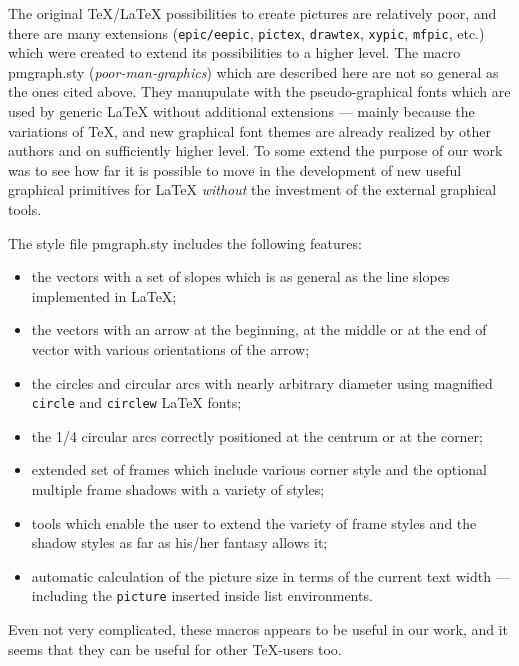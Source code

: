 \newcommand{\pmg}{{\sc pmgraph}}
\newcommand{\pmgs}{{\sc pmgraph.sty}}


\maketitle


The original \TeX/\LaTeX{} possibilities to create
pictures are relatively poor, and there are
many extensions ({\tt epic/eepic}, {\tt pictex}, {\tt drawtex},
{\tt xypic}, {\tt mfpic}, etc.) which were created to extend
its possibilities to a higher level. The macro \pmgs{}
({\em  poor-man-graphics}) which are
described here are not so general as the ones cited
above. They manupulate with the pseudo-graphical
fonts which are used by generic \LaTeX{} without additional
extensions --- mainly because the variations of
\PiC\TeX{}, \MF{} and new graphical font
themes are already realized by other authors
and on sufficiently higher level.
To some extend the purpose of our work was to see
how far it is possible to move in the development of new
useful graphical primitives for \LaTeX{} {\em without}
the investment of the external graphical tools.

The style file \pmgs{} includes the following features:
\begin{itemize}
\item
the vectors with a set of slopes which is
as general as the line slopes implemented in \LaTeX;
\item
the vectors with an arrow at the beginning,
at the middle or at the end of vector with various orientations
of the arrow;
\item
the circles and circular arcs with nearly arbitrary diameter
using magnified {\tt circle} and {\tt circlew} \LaTeX{} fonts;
\item
the 1/4 circular arcs correctly positioned
at the centrum or at the corner;
\item
extended set of frames which include various
corner style and the optional multiple frame shadows
with a variety of styles;
\item
tools which enable the user to extend the variety of
frame styles and the shadow styles as far as his/her
fantasy allows it;
\item
automatic calculation of the picture size in terms
of the current text width --- including the {\tt picture}
inserted inside list environments.
\end{itemize}
Even not very complicated, these macros appears to
be useful in our work, and it seems that they can be
useful for other \TeX-users too.


